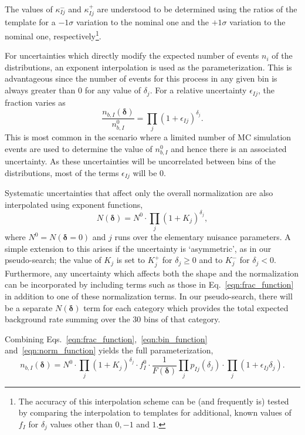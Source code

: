 \documentclass[11pt]{article}
\begin{document}
The values of $\kappa_{Ij}^{-}$ and $\kappa_{Ij}^{+}$ are understood to be determined using the ratios of the template for a $-1\sigma$ variation to the nominal one and the $+1\sigma$
variation to the nominal one, respectively\footnote{The accuracy of this interpolation scheme can be (and frequently is) tested by comparing the interpolation to templates for additional, known values of $f_{I}$ for $\delta_{j}$ values other than $0,-1$ and $1$.}.

For uncertainties which directly modify the expected number of events $n_{i}$ of the distributions, an exponent interpolation is used as the parameterization.
This is advantageous since the number of events for this process in any given bin is always greater than 0 for any value of $\delta_{j}$. For a relative uncertainty $\epsilon_{Ij}$, the fraction varies as
%
\begin{equation}
 \frac{n_{b,I}(\bm{\delta})}{n_{b,I}^{0}}  =  \prod_{j} (1+\epsilon_{Ij})^{\delta_{j}}.
  \label{eqn:bin_function}
\end{equation}
%
This is most common in the scenario where a limited number of MC simulation events are used to determine the value of $n_{b,I}^{0}$
and hence there is an associated uncertainty. As these uncertainties will be uncorrelated between bins of the distributions, most of the terms $\epsilon_{Ij}$ will be 0.

Systematic uncertainties that affect only the overall normalization are also interpolated using exponent functions,
%
\begin{equation}
 N(\bm{\delta})  =   N^{0} \cdot \prod_{j} (1+K_{j})^{\delta_{j}},
 \label{eqn:norm_function}
\end{equation}
%
where $N^{0} = N(\bm{\delta}=0)$ and $j$ runs over the elementary nuisance parameters.  A simple extension to this arises if the uncertainty is `asymmetric', as in our pseudo-search;
the value of $K_{j}$ is set to $K^{+}_{j}$ for $\delta_{j}\geq0$ and to $K^{-}_{j}$ for $\delta_{j} < 0$. Furthermore, any uncertainty which affects both the
shape and the normalization can be incorporated by including terms such as those in Eq.~\eqref{eqn:frac_function} in addition to one of these normalization terms.
In our pseudo-search, there will be a separate $N(\bm{\delta})$ term for each category which provides the total expected background rate summing over the 30 bins of that category.

Combining Eqs.~\eqref{eqn:frac_function},~\eqref{eqn:bin_function} and~\eqref{eqn:norm_function} yields the full parameterization,
%
\begin{equation}
 n_{b,I}(\bm{\delta}) = N^{0}\cdot \prod_{j}(1+K_{j})^{\delta_{j}} \cdot f^{0}_{I} \cdot\frac{1}{F(\bm{\delta})} \prod_{j} p_{Ij}(\delta_{j}) \cdot \prod_{j} (1+\epsilon_{Ij}\delta_{j}).
\label{eqn:expt_param}
\end{equation}
\end{document}
